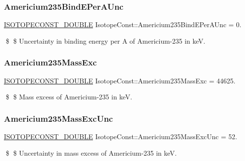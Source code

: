 \subsubsection{\texorpdfstring{Americium235\+Bind\+E\+Per\+A\+Unc}{Americium235BindEPerAUnc}}
{\footnotesize\ttfamily \mbox{\hyperlink{group___isotope_const-_macros_ga8f45a7272ce02c0b4c65c44636ed719a}{I\+S\+O\+T\+O\+P\+E\+C\+O\+N\+S\+T\+\_\+\+D\+O\+U\+B\+LE}} Isotope\+Const\+::\+Americium235\+Bind\+E\+Per\+A\+Unc = 0.}

\$ \$ Uncertainty in binding energy per A of Americium-\/235 in keV. \mbox{\label{group___isotope_const-_americium-_am235_gad41906014bba28d40225c2b9308ada36}} 
\subsubsection{\texorpdfstring{Americium235\+Mass\+Exc}{Americium235MassExc}}
{\footnotesize\ttfamily \mbox{\hyperlink{group___isotope_const-_macros_ga8f45a7272ce02c0b4c65c44636ed719a}{I\+S\+O\+T\+O\+P\+E\+C\+O\+N\+S\+T\+\_\+\+D\+O\+U\+B\+LE}} Isotope\+Const\+::\+Americium235\+Mass\+Exc = 44625.}

\$ \$ Mass excess of Americium-\/235 in keV. \mbox{\label{group___isotope_const-_americium-_am235_gace3f9a2a18d503abf15b83d45066477a}} 
\subsubsection{\texorpdfstring{Americium235\+Mass\+Exc\+Unc}{Americium235MassExcUnc}}
{\footnotesize\ttfamily \mbox{\hyperlink{group___isotope_const-_macros_ga8f45a7272ce02c0b4c65c44636ed719a}{I\+S\+O\+T\+O\+P\+E\+C\+O\+N\+S\+T\+\_\+\+D\+O\+U\+B\+LE}} Isotope\+Const\+::\+Americium235\+Mass\+Exc\+Unc = 52.}

\$ \$ Uncertainty in mass excess of Americium-\/235 in keV. \mbox{\label{group___isotope_const-_americium-_am235_ga300510ee39be59b4477da397b9477fc8}} 
